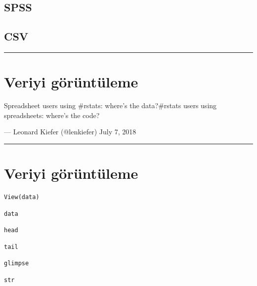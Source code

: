 \documentclass[]{article}
\begin{document}
\hypertarget{spss}{%
\subsection{SPSS}\label{spss}}

\hypertarget{csv}{%
\subsection{CSV}\label{csv}}

\begin{center}\rule{0.5\linewidth}{\linethickness}\end{center}

\hypertarget{veriyi-goruntuleme}{%
\section{Veriyi görüntüleme}\label{veriyi-goruntuleme}}

Spreadsheet users using \#rstats: where's the data?\#rstats users using
spreadsheets: where's the code?

--- Leonard Kiefer (@lenkiefer) July 7, 2018

\begin{center}\rule{0.5\linewidth}{\linethickness}\end{center}

\hypertarget{veriyi-goruntuleme-1}{%
\section{Veriyi görüntüleme}\label{veriyi-goruntuleme-1}}

\begin{verbatim}
View(data)
\end{verbatim}

\begin{verbatim}
data
\end{verbatim}

\begin{verbatim}
head
\end{verbatim}

\begin{verbatim}
tail
\end{verbatim}

\begin{verbatim}
glimpse
\end{verbatim}

\begin{verbatim}
str
\end{verbatim}
\end{document}
